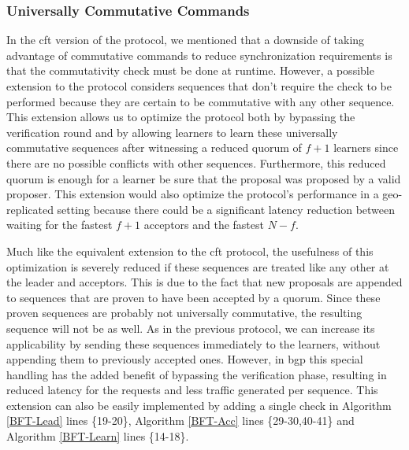 \subsubsection{Universally Commutative Commands}
In the \acrshort{cft} version of the protocol, we mentioned that a downside of taking advantage of commutative commands to reduce synchronization requirements is that the commutativity check must be done at runtime. However, a possible extension to the protocol considers sequences that don't require the check to be performed because they are certain to be commutative with any other sequence. This extension allows us to optimize the protocol both by bypassing the verification round and by allowing learners to learn these universally commutative sequences after witnessing a reduced quorum of $f+1$ learners since there are no possible conflicts with other sequences. Furthermore, this reduced quorum is enough for a learner be sure that the proposal was proposed by a valid proposer. This extension would also optimize the protocol's performance in a geo-replicated setting because there could be a significant latency reduction between waiting for the fastest $f+1$ acceptors and the fastest $N-f$.\par
{\color{red} Much like the equivalent extension to the \acrshort{cft} protocol, the usefulness of this optimization is severely reduced if these sequences are treated like any other at the leader and acceptors. This is due to the fact that new proposals are appended to sequences that are proven to have been accepted by a quorum. Since these proven sequences are probably not universally commutative, the resulting sequence will not be as well. As in the previous protocol, we can increase its applicability by sending these sequences immediately to the learners, without appending them to previously accepted ones. However, in \acrshort{bgp} this special handling has the added benefit of bypassing the verification phase, resulting in reduced latency for the requests and less traffic generated per sequence. This extension can also be easily implemented by adding a single check in Algorithm \ref{BFT-Lead} lines \{19-20\}, Algorithm \ref{BFT-Acc} lines \{29-30,40-41\} and Algorithm \ref{BFT-Learn} lines \{14-18\}.}

